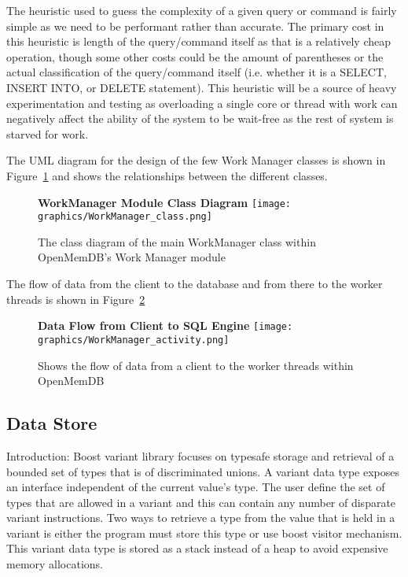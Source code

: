 \documentclass[letterpaper, 12pt]{article}
\begin{document}
  The heuristic used to guess the complexity of a given query or command is fairly simple as we need to
  be performant rather than accurate. The primary cost in this heuristic is length of the query/command itself
  as that is a relatively cheap operation, though some other costs could be the amount of parentheses
  or the actual classification of the query/command itself (i.e. whether it is a SELECT, INSERT INTO, or DELETE statement).
  This heuristic will be a source of heavy experimentation and testing as overloading a single core or thread
  with work can negatively affect the ability of the system to be wait-free as the rest of system is
  starved for work.
  \par\vspace{\baselineskip}
  The UML diagram for the design of the few Work Manager classes is shown in Figure~\ref{fig:work_manager_class}
  and shows the relationships between the different classes.
  
  \begin{figure}
   \centering
   \label{fig:work_manager_class}
   \textbf{WorkManager Module Class Diagram}
   \texttt{[image: graphics/WorkManager\_class.png]}
   \caption{The class diagram of the main WorkManager class within OpenMemDB's Work Manager module}
  \end{figure}

  The flow of data from the client to the database and from there to the worker threads
  is shown in Figure~\ref{fig:work_manager_activity}
  \begin{figure}
   \centering
   \label{fig:work_manager_activity}
   \textbf{Data Flow from Client to SQL Engine}
   \texttt{[image: graphics/WorkManager\_activity.png]}
   \caption{Shows the flow of data from a client to the worker threads within OpenMemDB}
  \end{figure}

  \subsection{Data Store}
Introduction:
Boost variant library focuses on typesafe storage and retrieval of a bounded set of types that is
of discriminated unions. A variant data type exposes an interface independent of the current value's type.
The user define the set of types that are allowed in a variant and this can contain any number of disparate
variant instructions. Two ways to retrieve a type from the value that is held in a variant is either the program
must store this type or use boost visitor mechanism. This variant data type is stored as a stack instead of a heap
to avoid expensive memory allocations.
\par\vspace{\baselineskip}
\end{document}
